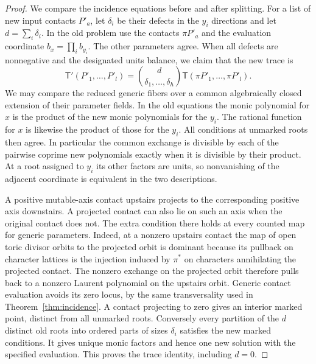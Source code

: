 \documentclass[11pt,reqno]{amsart}
\numberwithin{equation}{section}
\theoremstyle{definition}
\theoremstyle{remark}
\begin{document}
\begin{proof}
We compare the incidence equations before and after splitting.
For a list of new input contacts \(P'_a\), let \(\delta_i\) be
their defects in the \(y_i\) directions and let \(d=\sum_i\delta_i\).
In the old problem use the contacts \(\pi P'_a\) and the evaluation
coordinate \(b_x=\prod_i b_{y_i}\). The other parameters agree. When
all defects are nonnegative and the designated units balance, we claim
that the new trace is
\begin{equation}\label{eq:split-trace}
\mathsf T'(P'_1,\ldots,P'_l) =\binom{d}{\delta_1,\ldots,\delta_h} \mathsf T(\pi P'_1,\ldots,\pi P'_l).
\end{equation}
We may compare the reduced generic fibers over a common algebraically
closed extension of their parameter fields. In the old equations the
monic polynomial for \(x\) is the product of the new monic polynomials
for the \(y_i\). The rational function for \(x\) is likewise the
product of those for the \(y_i\). All conditions at unmarked roots
then agree. In particular the common exchange is divisible by each
of the pairwise coprime new polynomials exactly when it is divisible
by their product. At a root assigned to \(y_i\) its other factors are
units, so nonvanishing of the adjacent coordinate is equivalent in
the two descriptions.

A positive mutable-axis contact upstairs projects to the corresponding
positive axis downstairs. A projected contact can also lie on such an
axis when the original contact does not. The extra condition there holds
at every counted map for generic parameters. Indeed, at a nonzero
upstairs contact the map of open toric divisor orbits to the projected
orbit is dominant because its pullback on character lattices is the injection induced by \(\pi^*\) on characters annihilating the projected contact. The
nonzero exchange on the projected orbit therefore pulls back to a
nonzero Laurent polynomial on the upstairs orbit. Generic contact
evaluation avoids its zero locus, by the same transversality used
in Theorem~\ref{thm:incidence}. A contact projecting to zero gives
an interior marked point, distinct from all unmarked roots. Conversely
every partition of the \(d\) distinct old roots into ordered parts of
sizes \(\delta_i\) satisfies the new marked conditions. It gives unique
monic factors and hence one new solution with the specified evaluation.
This proves the trace identity, including \(d=0\).


\end{proof}
\end{document}
